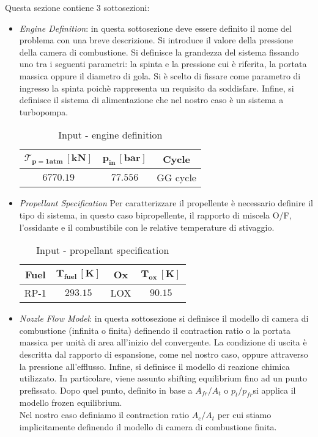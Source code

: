 Questa sezione contiene 3 sottosezioni:
\begin{itemize}
\item \textit{Engine Definition}: in questa sottosezione deve essere definito il nome del problema con una breve descrizione. Si introduce il valore della pressione della camera di combustione. Si definisce la grandezza del sistema fissando uno tra i seguenti parametri: la spinta e la pressione cui è riferita, la portata massica oppure il diametro di gola. Si è scelto di fissare come parametro di ingresso la spinta	 poichè rappresenta un requisito da soddisfare. Infine, si definisce il sistema di alimentazione che nel nostro caso è un sistema a turbopompa.
\begin{table}[H]

\centering
\begin{tabular}{|c|c|c|}
\hline
$\bm{\mathcal{T}_{p=1atm} \, [kN]} $ & $\bm{p_{in} \, [bar]}$ & \textbf{Cycle} \\
\hline
$6770.19$ & $77.556$ & {GG cycle} \\
\hline
\end{tabular}
\caption{Input - engine definition}
\label{table:engine_def}
\end{table}


\item \textit{Propellant Specification} Per caratterizzare il propellente è necessario definire il tipo di sistema, in questo caso bipropellente, il rapporto di miscela O/F, l'ossidante e il combustibile con le relative temperature di stivaggio. 
\begin{table}[H]
\centering
\begin{tabular}{|c|c|c|c|}
\hline
\textbf{Fuel} & $\bm{T_{fuel} \, [K]}$ & \textbf{Ox} & $\bm{T_{ox} \, [K]}$  \\
\hline
{RP-1} & $293.15$ & {LOX} & $90.15$ \\
\hline
\end{tabular}
\caption{Input - propellant specification}
\label{table:prop_spec}
\end{table}
\item \textit{Nozzle Flow Model}: in questa sottosezione si definisce il modello di camera di combustione (infinita o finita) definendo il contraction ratio o la portata massica per unità di area all'inizio del convergente. La  condizione di uscita è descritta dal rapporto di espansione, come nel nostro caso, oppure attraverso la pressione all'efflusso. Infine, si definisce il modello di reazione chimica utilizzato. In particolare, viene assunto shifting equilibrium fino ad un punto prefissato. Dopo quel punto, definito in base a $A_{fr}/A_t$ o $p_t/p_{fr}$si applica il modello frozen equilibrium. \\
Nel nostro caso definiamo il contraction ratio $A_c/A_t$ per cui stiamo implicitamente definendo il modello di camera di combustione finita.


\end{itemize}
